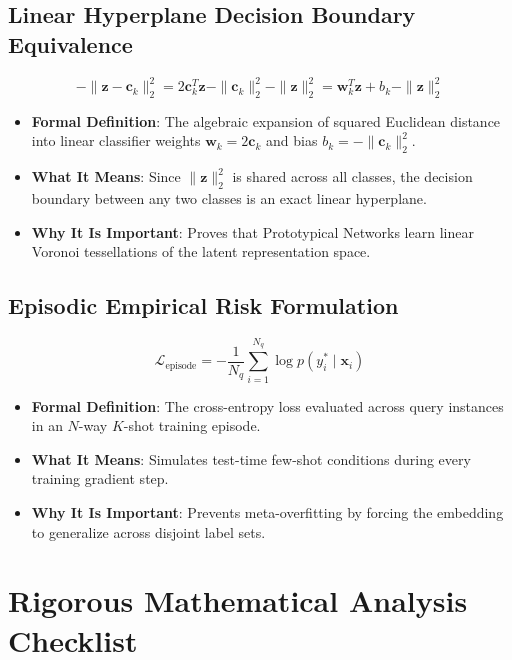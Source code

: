 \documentclass[11pt,a4paper]{article}
\theoremstyle{definition}
\begin{document}
\subsection{Linear Hyperplane Decision Boundary Equivalence}
{\boldmath
\begin{equation}
-\|\mathbf{z} - \mathbf{c}_k\|_2^2 = 2 \mathbf{c}_k^T \mathbf{z} - \|\mathbf{c}_k\|_2^2 - \|\mathbf{z}\|_2^2 = \mathbf{w}_k^T \mathbf{z} + b_k - \|\mathbf{z}\|_2^2
\end{equation}
}
\begin{itemize}
    \item \textbf{Formal Definition}: The algebraic expansion of squared Euclidean distance into linear classifier weights $\mathbf{w}_k = 2\mathbf{c}_k$ and bias $b_k = -\|\mathbf{c}_k\|_2^2$.
    \item \textbf{What It Means}: Since $\|\mathbf{z}\|_2^2$ is shared across all classes, the decision boundary between any two classes is an exact linear hyperplane.
    \item \textbf{Why It Is Important}: Proves that Prototypical Networks learn linear Voronoi tessellations of the latent representation space.
\end{itemize}

\subsection{Episodic Empirical Risk Formulation}
{\boldmath
\begin{equation}
\mathcal{L}_{\text{episode}} = -\frac{1}{N_q} \sum_{i=1}^{N_q} \log p(y_i^* \mid \mathbf{x}_i)
\end{equation}
}
\begin{itemize}
    \item \textbf{Formal Definition}: The cross-entropy loss evaluated across query instances in an $N$-way $K$-shot training episode.
    \item \textbf{What It Means}: Simulates test-time few-shot conditions during every training gradient step.
    \item \textbf{Why It Is Important}: Prevents meta-overfitting by forcing the embedding to generalize across disjoint label sets.
\end{itemize}

\section{Rigorous Mathematical Analysis Checklist}
\end{document}
